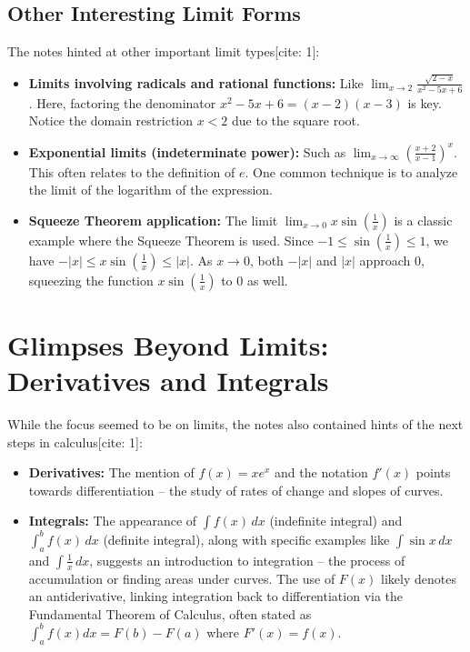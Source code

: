 \documentclass[12pt]{article}
\begin{document}
\subsection{Other Interesting Limit Forms}
The notes hinted at other important limit types[cite: 1]:
\begin{itemize}
    \item \textbf{Limits involving radicals and rational functions:} Like $\lim_{x \to 2} \frac{\sqrt{2-x}}{x^2 - 5x + 6}$. Here, factoring the denominator $x^2 - 5x + 6 = (x-2)(x-3)$ is key. Notice the domain restriction $x<2$ due to the square root.
    \item \textbf{Exponential limits (indeterminate power):} Such as $\lim_{x \to \infty} \left( \frac{x+2}{x-1} \right)^x$. This often relates to the definition of $e$. One common technique is to analyze the limit of the logarithm of the expression.
    \item \textbf{Squeeze Theorem application:} The limit $\lim_{x \to 0} x \sin\left(\frac{1}{x}\right)$ is a classic example where the Squeeze Theorem is used. Since $-1 \le \sin(\frac{1}{x}) \le 1$, we have $-|x| \le x \sin(\frac{1}{x}) \le |x|$. As $x \to 0$, both $-|x|$ and $|x|$ approach 0, squeezing the function $x \sin(\frac{1}{x})$ to 0 as well.
\end{itemize}

\section{Glimpses Beyond Limits: Derivatives and Integrals}

While the focus seemed to be on limits, the notes also contained hints of the next steps in calculus[cite: 1]:

\begin{itemize}
    \item \textbf{Derivatives:} The mention of $f(x) = xe^x$ and the notation $f'(x)$ points towards differentiation – the study of rates of change and slopes of curves.
    \item \textbf{Integrals:} The appearance of $\int f(x) \, dx$ (indefinite integral) and $\int_a^b f(x) \, dx$ (definite integral), along with specific examples like $\int \sin x \, dx$ and $\int \frac{1}{x} \, dx$, suggests an introduction to integration – the process of accumulation or finding areas under curves. The use of $F(x)$ likely denotes an antiderivative, linking integration back to differentiation via the Fundamental Theorem of Calculus, often stated as $\int_a^b f(x) dx = F(b) - F(a)$ where $F'(x) = f(x)$.
\end{itemize}
\end{document}
